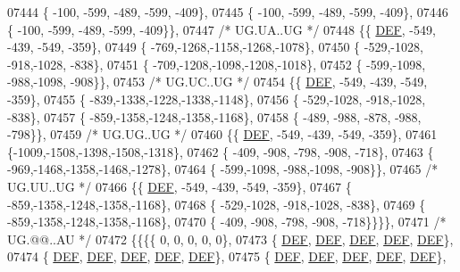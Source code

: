 \begin{DoxyCode}
07444 \{ -100, -599, -489, -599, -409\},
07445 \{ -100, -599, -489, -599, -409\},
07446 \{ -100, -599, -489, -599, -409\}\},
07447 \textcolor{comment}{/* UG.UA..UG */}
07448 \{\{  \mbox{\hyperlink{1_88_84__epars_8h_a397419fc12b37ed479c8abb9d444d843}{DEF}}, -549, -439, -549, -359\},
07449 \{ -769,-1268,-1158,-1268,-1078\},
07450 \{ -529,-1028, -918,-1028, -838\},
07451 \{ -709,-1208,-1098,-1208,-1018\},
07452 \{ -599,-1098, -988,-1098, -908\}\},
07453 \textcolor{comment}{/* UG.UC..UG */}
07454 \{\{  \mbox{\hyperlink{1_88_84__epars_8h_a397419fc12b37ed479c8abb9d444d843}{DEF}}, -549, -439, -549, -359\},
07455 \{ -839,-1338,-1228,-1338,-1148\},
07456 \{ -529,-1028, -918,-1028, -838\},
07457 \{ -859,-1358,-1248,-1358,-1168\},
07458 \{ -489, -988, -878, -988, -798\}\},
07459 \textcolor{comment}{/* UG.UG..UG */}
07460 \{\{  \mbox{\hyperlink{1_88_84__epars_8h_a397419fc12b37ed479c8abb9d444d843}{DEF}}, -549, -439, -549, -359\},
07461 \{-1009,-1508,-1398,-1508,-1318\},
07462 \{ -409, -908, -798, -908, -718\},
07463 \{ -969,-1468,-1358,-1468,-1278\},
07464 \{ -599,-1098, -988,-1098, -908\}\},
07465 \textcolor{comment}{/* UG.UU..UG */}
07466 \{\{  \mbox{\hyperlink{1_88_84__epars_8h_a397419fc12b37ed479c8abb9d444d843}{DEF}}, -549, -439, -549, -359\},
07467 \{ -859,-1358,-1248,-1358,-1168\},
07468 \{ -529,-1028, -918,-1028, -838\},
07469 \{ -859,-1358,-1248,-1358,-1168\},
07470 \{ -409, -908, -798, -908, -718\}\}\}\},
07471 \textcolor{comment}{/* UG.@@..AU */}
07472 \{\{\{\{    0,    0,    0,    0,    0\},
07473 \{  \mbox{\hyperlink{1_88_84__epars_8h_a397419fc12b37ed479c8abb9d444d843}{DEF}},  \mbox{\hyperlink{1_88_84__epars_8h_a397419fc12b37ed479c8abb9d444d843}{DEF}},  \mbox{\hyperlink{1_88_84__epars_8h_a397419fc12b37ed479c8abb9d444d843}{DEF}},  \mbox{\hyperlink{1_88_84__epars_8h_a397419fc12b37ed479c8abb9d444d843}{DEF}},  \mbox{\hyperlink{1_88_84__epars_8h_a397419fc12b37ed479c8abb9d444d843}{DEF}}\},
07474 \{  \mbox{\hyperlink{1_88_84__epars_8h_a397419fc12b37ed479c8abb9d444d843}{DEF}},  \mbox{\hyperlink{1_88_84__epars_8h_a397419fc12b37ed479c8abb9d444d843}{DEF}},  \mbox{\hyperlink{1_88_84__epars_8h_a397419fc12b37ed479c8abb9d444d843}{DEF}},  \mbox{\hyperlink{1_88_84__epars_8h_a397419fc12b37ed479c8abb9d444d843}{DEF}},  \mbox{\hyperlink{1_88_84__epars_8h_a397419fc12b37ed479c8abb9d444d843}{DEF}}\},
07475 \{  \mbox{\hyperlink{1_88_84__epars_8h_a397419fc12b37ed479c8abb9d444d843}{DEF}},  \mbox{\hyperlink{1_88_84__epars_8h_a397419fc12b37ed479c8abb9d444d843}{DEF}},  \mbox{\hyperlink{1_88_84__epars_8h_a397419fc12b37ed479c8abb9d444d843}{DEF}},  \mbox{\hyperlink{1_88_84__epars_8h_a397419fc12b37ed479c8abb9d444d843}{DEF}},  \mbox{\hyperlink{1_88_84__epars_8h_a397419fc12b37ed479c8abb9d444d843}{DEF}}\},

\end{DoxyCode}
